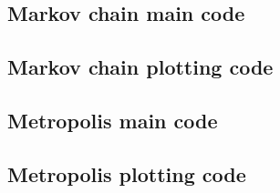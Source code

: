 \documentclass[twocolumn]{myarticle}
\begin{document}
\subsection{Markov chain main code}
\label{subsec:markov_chain_main_code}


\vspace{10pt}

\subsection{Markov chain plotting code}
\label{subsec:markov_chain_plotting_code}


\vspace{10pt}

\subsection{Metropolis main code}
\label{subsec:metropolis_main_code}


\vspace{10pt}

\subsection{Metropolis plotting code}
\label{subsec:metropolis_plotting_code}


\vspace{10pt}
\end{document}
